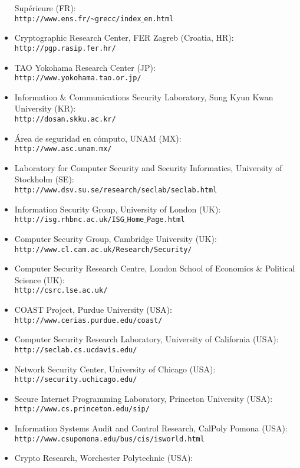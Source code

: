 \begin{itemize}
Sup\'erieure (FR):\\
{\tt http://www.ens.fr/\~{}grecc/index$\_$en.html}
\item Cryptographic Research Center, FER Zagreb (Croatia, HR):\\
{\tt http://pgp.rasip.fer.hr/}
\item TAO Yokohama Research Center (JP):\\
{\tt http://www.yokohama.tao.or.jp/}
\item Information \& Communications Security Laboratory, Sung Kyun Kwan University (KR):\\
{\tt http://dosan.skku.ac.kr/}
\item \'Area de seguridad en c\'omputo, UNAM (MX):\\
{\tt http://www.asc.unam.mx/}
\item Laboratory for Computer Security and Security Informatics, University of Stockholm (SE):\\
{\tt http://www.dsv.su.se/research/seclab/seclab.html}
\item Information Security Group, University of London (UK):\\
{\tt http://isg.rhbnc.ac.uk/ISG$\_$Home$\_$Page.html}
\item Computer Security Group, Cambridge University (UK):\\
{\tt http://www.cl.cam.ac.uk/Research/Security/}
\item Computer Security Research Centre, London School of Economics \& Political Science (UK):\\
{\tt http://csrc.lse.ac.uk/}
\item COAST Project, Purdue University (USA):\\
{\tt http://www.cerias.purdue.edu/coast/}
\item Computer Security Research Laboratory, University of California (USA):\\
{\tt http://seclab.cs.ucdavis.edu/}
\item Network Security Center, University of Chicago (USA):\\
{\tt http://security.uchicago.edu/}
\item Secure Internet Programming Laboratory, Princeton University (USA):\\
{\tt http://www.cs.princeton.edu/sip/}
\item Information Systems Audit and Control Research, CalPoly Pomona (USA):\\
{\tt http://www.csupomona.edu/bus/cis/isworld.html}
\item Crypto Research, Worchester Polytechnic (USA):\\

\end{itemize}
